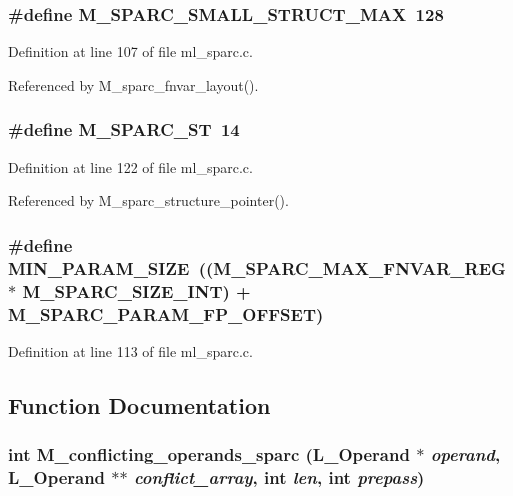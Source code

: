 \subsubsection{\setlength{\rightskip}{0pt plus 5cm}\#define M\_\-SPARC\_\-SMALL\_\-STRUCT\_\-MAX~128}\label{ml__sparc_8c_80a3cdd2936be0d768657854b4c221d9}




Definition at line 107 of file ml\_\-sparc.c.

Referenced by M\_\-sparc\_\-fnvar\_\-layout().
\subsubsection{\setlength{\rightskip}{0pt plus 5cm}\#define M\_\-SPARC\_\-ST~14}\label{ml__sparc_8c_63ac0596f84d4446495c4e45a1f89e8c}




Definition at line 122 of file ml\_\-sparc.c.

Referenced by M\_\-sparc\_\-structure\_\-pointer().
\subsubsection{\setlength{\rightskip}{0pt plus 5cm}\#define MIN\_\-PARAM\_\-SIZE~((M\_\-SPARC\_\-MAX\_\-FNVAR\_\-REG $\ast$ M\_\-SPARC\_\-SIZE\_\-INT) + M\_\-SPARC\_\-PARAM\_\-FP\_\-OFFSET)}\label{ml__sparc_8c_48f1f5d33d6770a468f7767465e07abb}




Definition at line 113 of file ml\_\-sparc.c.

\subsection{Function Documentation}
\subsubsection{\setlength{\rightskip}{0pt plus 5cm}int M\_\-conflicting\_\-operands\_\-sparc (L\_\-Operand $\ast$ {\em operand}, L\_\-Operand $\ast$$\ast$ {\em conflict\_\-array}, int {\em len}, int {\em prepass})}\label{ml__sparc_8c_74e8faecdc28492f0582753ab26f71c0}




